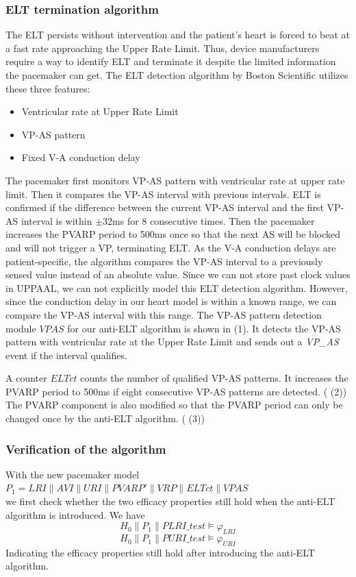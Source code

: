 \subsubsection{ELT termination algorithm} 
The ELT persists without intervention and the patient's heart is forced to beat at a fast rate approaching the Upper Rate Limit. Thus, device manufacturers require a way to identify ELT and terminate it despite the limited information the pacemaker can get. The ELT detection algorithm by Boston Scientific \cite{challenge} utilizes these three features:
\begin{itemize}
  \item Ventricular rate at Upper Rate Limit
	\item VP-AS pattern
	\item Fixed V-A conduction delay
\end{itemize}
The pacemaker first monitors VP-AS pattern with ventricular rate at upper rate limit. Then it compares the VP-AS interval with previous intervals. ELT is confirmed if the difference between the current VP-AS interval and the first VP-AS interval is within $\pm$32ms for 8 consecutive times. Then the pacemaker increases the PVARP period to 500ms once so that the next AS will be blocked and will not trigger a VP, terminating ELT.
As the V-A conduction delays are patient-specific, the algorithm compares the VP-AS interval to a previously sensed value instead of an absolute value. Since we can not store past clock values in UPPAAL, we can not explicitly model this ELT detection algorithm. However, since the conduction delay in our heart model is within a known range, we can compare the VP-AS interval with this range. The VP-AS pattern detection module $VPAS$ for our anti-ELT algorithm is shown in  (1). It detects the VP-AS pattern with ventricular rate at the Upper Rate Limit and sends out a \emph{VP\_AS} event if the interval qualifies. 

A counter $ELTct$ counts the number of qualified VP-AS patterns. It increases the PVARP period to 500ms if eight consecutive VP-AS patterns are detected. ( (2)) The PVARP component is also modified so that the PVARP period can only be changed once by the anti-ELT algorithm. ( (3))

\subsubsection{Verification of the algorithm}
With the new pacemaker model\\ 
$P_1=LRI\|AVI\|URI\|PVARP'\|VRP\|ELTct\|VPAS$\\
we first check whether the two efficacy properties still hold when the anti-ELT algorithm is introduced. We have 
$$H_0\|P_1\|PLRI\_test\models\varphi_{LRI}$$
$$H_0\|P_1\|PURI\_test\models\varphi_{URI}$$
Indicating the efficacy properties still hold after introducing the anti-ELT algorithm.

